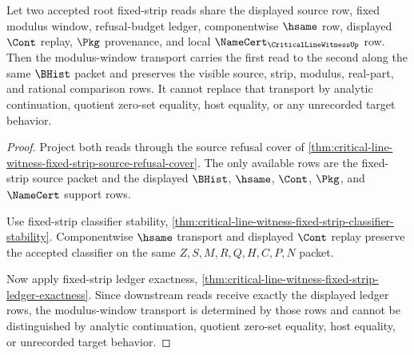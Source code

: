 \begin{theorem}
\label{thm:critical-line-witness-modulus-window-transport}
Let two accepted root fixed-strip reads share the displayed source row, fixed modulus window, refusal-budget ledger, componentwise $\hsame$ row, displayed $\Cont$ replay, $\Pkg$ provenance, and local $\NameCert_{\CriticalLineWitnessUp}$ row. Then the modulus-window transport carries the first read to the second along the same $\BHist$ packet and preserves the visible source, strip, modulus, real-part, and rational comparison rows. It cannot replace that transport by analytic continuation, quotient zero-set equality, host equality, or any unrecorded target behavior.
\end{theorem}
\begin{proof}
Project both reads through the source refusal cover of \autoref{thm:critical-line-witness-fixed-strip-source-refusal-cover}. The only available rows are the fixed-strip source packet and the displayed $\BHist$, $\hsame$, $\Cont$, $\Pkg$, and $\NameCert$ support rows.

Use fixed-strip classifier stability, \autoref{thm:critical-line-witness-fixed-strip-classifier-stability}. Componentwise $\hsame$ transport and displayed $\Cont$ replay preserve the accepted classifier on the same $Z,S,M,R,Q,H,C,P,N$ packet.

Now apply fixed-strip ledger exactness, \autoref{thm:critical-line-witness-fixed-strip-ledger-exactness}. Since downstream reads receive exactly the displayed ledger rows, the modulus-window transport is determined by those rows and cannot be distinguished by analytic continuation, quotient zero-set equality, host equality, or unrecorded target behavior.
\end{proof}

